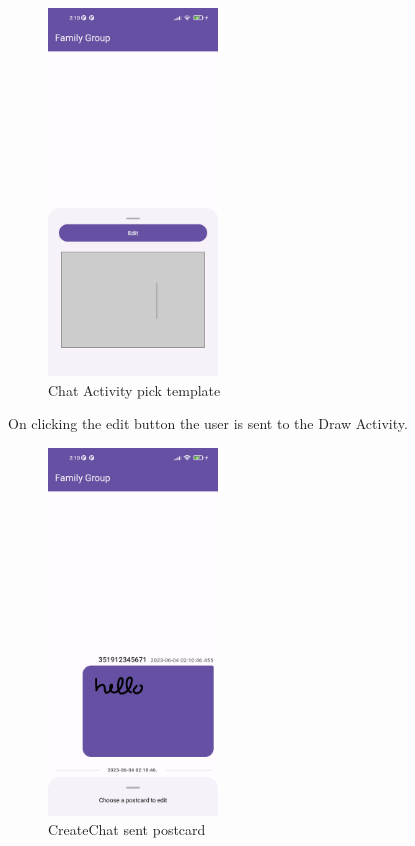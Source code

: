 \newpage

\begin{figure}[!ht]
	\centering
	\includegraphics[trim={0cm -3cm 0 -3cm}, width=0.4\textwidth]{./Chapter6/Figures/Chat Pick Template}
	\caption{Chat Activity pick template}
	\label{fig:CVA3}
\end{figure}

On clicking the edit button the user is sent to the Draw Activity.

\newpage

\begin{figure}[!ht]
	\centering
	\includegraphics[trim={0cm -3cm 0 -3cm}, width=0.4\textwidth]{./Chapter6/Figures/Sent Postcard}
	\caption{CreateChat sent postcard}
	\label{fig:CVA4}
\end{figure}

